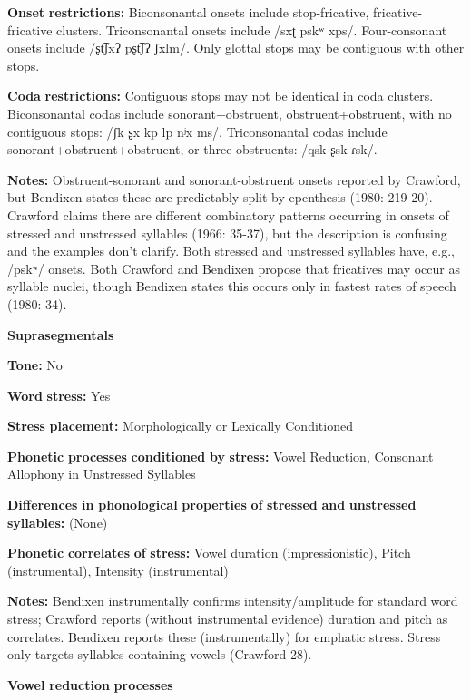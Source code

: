 \textbf{Onset} \textbf{restrictions:} Biconsonantal onsets include stop-fricative, fricative-fricative clusters. Triconsonantal onsets include /sxʈ pskʷ xps/. Four-consonant onsets include /ʂt͡ʃxʔ pʂt͡ʃʔ ʃxlm/. Only glottal stops may be contiguous with other stops.

\textbf{Coda} \textbf{restrictions:} Contiguous stops may not be identical in coda clusters. Biconsonantal codas include sonorant+obstruent, obstruent+obstruent, with no contiguous stops: /ʃk ʂx kp lp nʲx ms/. Triconsonantal codas include sonorant+obstruent+obstruent, or three obstruents: /qsk ʂsk ɾsk/.

\textbf{Notes:} Obstruent-sonorant and sonorant-obstruent onsets reported by Crawford, but Bendixen states these are predictably split by epenthesis (1980: 219-20). Crawford claims there are different combinatory patterns occurring in onsets of stressed and unstressed syllables (1966: 35-37), but the description is confusing and the examples don’t clarify. Both stressed and unstressed syllables have, e.g., /pskʷ/ onsets. Both Crawford and Bendixen propose that fricatives may occur as syllable nuclei, though Bendixen states this occurs only in fastest rates of speech (1980: 34).

\textbf{Suprasegmentals}

\textbf{Tone:} No

\textbf{Word} \textbf{stress:} Yes

\textbf{Stress} \textbf{placement:} Morphologically or Lexically Conditioned

\textbf{Phonetic} \textbf{processes} \textbf{conditioned} \textbf{by} \textbf{stress:} Vowel Reduction, Consonant Allophony in Unstressed Syllables

\textbf{Differences} \textbf{in} \textbf{phonological} \textbf{properties} \textbf{of} \textbf{stressed} \textbf{and} \textbf{unstressed} \textbf{syllables:} (None)

\textbf{Phonetic} \textbf{correlates} \textbf{of} \textbf{stress:} Vowel duration (impressionistic), Pitch (instrumental), Intensity (instrumental)

\textbf{Notes:} Bendixen instrumentally confirms intensity/amplitude for standard word stress; Crawford reports (without instrumental evidence) duration and pitch as correlates. Bendixen reports these (instrumentally) for emphatic stress. Stress only targets syllables containing vowels (Crawford 28).

\textbf{Vowel} \textbf{reduction} \textbf{processes}

